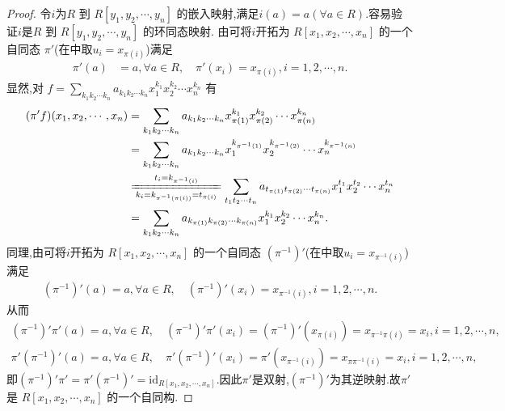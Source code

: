 \documentclass[../../main.tex]{subfiles}%
\begin{document}
\begin{proof}

令$i$为\( R \) 到 \( R[y_1, y_2, \cdots, y_n] \) 的嵌入映射,满足\( i(a) = a (\forall a \in R) \).容易验证$i$是\( R \) 到 \( R[y_1, y_2, \cdots, y_n] \) 的环同态映射.
由可将$i$开拓为 \( R[x_1, x_2, \cdots, x_n] \) 的一个自同态 \( \pi' \)(在中取$u_i=x_{\pi(i)}$)满足
\begin{align*}
\pi'(a) &= a, \forall a \in R, \quad \pi'(x_i) = x_{\pi(i)}, i = 1, 2, \cdots, n.
\end{align*}
显然,对 \( f = \sum\limits_{k_1k_2\cdots k_n} a_{k_1k_2\cdots k_n} x_1^{k_1} x_2^{k_2} \cdots x_n^{k_n} \) 有
\begin{align*}
(\pi ' f)(x_1,x_2,\cdots ,x_n)&=\sum_{k_1k_2\cdots k_n}{a_{k_1k_2\cdots k_n}x_{\pi (1)}^{k_1}x_{\pi (2)}^{k_2}}\cdots x_{\pi (n)}^{k_n}
\\
&=\sum_{k_1k_2\cdots k_n}{a_{k_1k_2\cdots k_n}x_{1}^{k_{\pi ^{-1}(1)}}x_{2}^{k_{\pi ^{-1}(2)}}}\cdots x_{n}^{k_{\pi ^{-1}(n)}}
\\
&\xlongequal[k_i=k_{\pi ^{-1}\left( \pi \left( i \right) \right)}=t_{\pi \left( i \right)}]{t_i=k_{\pi ^{-1}\left( i \right)}}\sum_{t_1t_2\cdots t_n}{a_{t_{\pi (1)}t_{\pi (2)}\cdots t_{\pi (n)}}x_{1}^{t_1}x_{2}^{t_2}}\cdots x_{n}^{t_n}
\\
&=\sum_{k_1k_2\cdots k_n}{a_{k_{\pi (1)}k_{\pi (2)}\cdots k_{\pi (n)}}x_{1}^{k_1}x_{2}^{k_2}}\cdots x_{n}^{k_n}.
\end{align*}
同理,由可将$i$开拓为 \( R[x_1, x_2, \cdots, x_n] \) 的一个自同态 \( \left( \pi ^{-1} \right)' \)(在中取$u_i=x_{\pi^{-1}(i)}$)满足
\begin{align*}
\left( \pi ^{-1} \right)' (a)=a,\forall a\in R,\quad \left( \pi ^{-1} \right)' (x_i)=x_{\pi ^{-1}(i)},i=1,2,\cdots ,n.
\end{align*}
从而
\begin{gather*}
\left( \pi ^{-1} \right) ' \pi ' \left( a \right) =a,\forall a\in R,\quad \left( \pi ^{-1} \right) ' \pi ' (x_i)=\left( \pi ^{-1} \right) ' \left( x_{\pi (i)} \right) =x_{\pi ^{-1}\pi (i)}=x_i,i=1,2,\cdots ,n,
\\
\pi ' \left( \pi ^{-1} \right) ' \left( a \right) =a,\forall a\in R,\quad \pi ' \left( \pi ^{-1} \right) ' (x_i)=\pi ' \left( x_{\pi ^{-1}(i)} \right) =x_{\pi \pi ^{-1}(i)}=x_i,i=1,2,\cdots ,n,
\end{gather*}
即$\left( \pi ^{-1} \right)' \pi' =\pi' \left( \pi ^{-1} \right)' =\mathrm{id}_{R[x_1,x_2,\cdots ,x_n]}.$因此$\pi'$是双射,$(\pi^{-1})'$为其逆映射.故\( \pi' \) 是 \( R[x_1, x_2, \cdots, x_n] \) 的一个自同构.



\end{proof}
\end{document}
